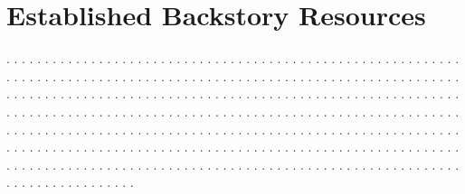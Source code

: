 \documentclass[letterpaper]{twentysecondcv} %
\begin{document}
\section{Established Backstory Resources}
{. . . . . . . . . . . . . . . . . . . . . . . . . . . . . . . . . . . . . . . . . . . . . . . . . . . . . . . . . . . . . . . . . . . . . . . . . . . . . . . . . . . . . . . . . . . . . . . . . . . . . . . . . . . . . . . . . . . . . . . . . . . . . . . . . . . . . . . . . . . . . . . . . . . . . . . . . . . . . . . . . . . . . . . . . . . . . . . . . . . . . . . . . . . . . . . . . . . . . . . . . . . . . . . . . . . . . . .}
{. . . . . . . . . . . . . . . . . . . . . . . . . . . . . . . . . . . . . . . . . . . . . . . . . . . . . . . . . . . . . . . . . . . . . . . . . . . . . . . . . . . . . . . . . . . . . . . . . . . . . . . . . . . . . . . . . . . . . . . . . . . . . . . . . . . . . . . . . . . . . . . . . . . . . . . . . . . . . . . . . . . . . . . . . . . . . . . . . . . . . . . . . . . . . . . . . . . . . . . . . . . . . . . . . . . . . . .}
\end{document}
